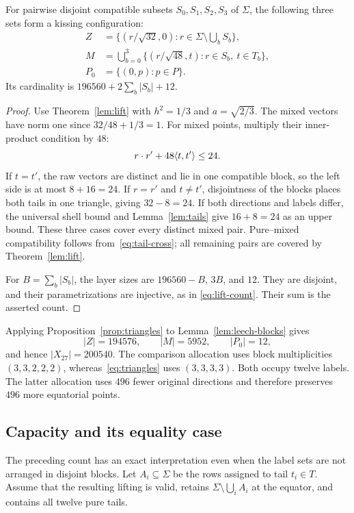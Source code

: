 \begin{proposition}\label{prop:triangles}
For pairwise disjoint compatible subsets $S_0,S_1,S_2,S_3$ of $\Sigma$,
the following three sets form a kissing configuration:
\begin{align}
 Z&=\{(r/\sqrt{32},0):r\in\Sigma\setminus\textstyle\bigcup_bS_b\},
 \nonumber\\
 M&=\bigcup_{b=0}^{3}\{(r/\sqrt{48},t):r\in S_b,\ t\in T_b\},
 \label{eq:d27}\\
 P_0&=\{(0,p):p\in P\}.\nonumber
\end{align}
Its cardinality is $196560+2\sum_b|S_b|+12$.
\end{proposition}
\begin{proof}
Use Theorem~\ref{lem:lift} with $h^2=1/3$ and $a=\sqrt{2/3}$.
The mixed vectors have norm one since $32/48+1/3=1$.
For mixed points, multiply their inner-product condition by $48$:
\begin{equation}\label{eq:raw-mixed}
 r\cdot r'+48\langle t,t'\rangle\le24.
\end{equation}
If $t=t'$, the raw vectors are distinct and lie in one compatible
block, so the left side is at most $8+16=24$. If $r=r'$ and $t\ne t'$,
disjointness of the blocks places both tails in one triangle, giving
$32-8=24$. If both directions and labels differ, the universal shell
bound and Lemma~\ref{lem:tails} give $16+8=24$ as an upper bound.
These three cases cover every distinct mixed pair. Pure--mixed
compatibility follows from~\eqref{eq:tail-cross}; all remaining pairs
are covered by Theorem~\ref{lem:lift}.

For $B=\sum_b|S_b|$, the layer sizes are $196560-B$, $3B$, and $12$.
They are disjoint, and their parametrizations are injective, as in
\eqref{eq:lift-count}. Their sum is the asserted count.
\end{proof}

Applying Proposition~\ref{prop:triangles} to Lemma~\ref{lem:leech-blocks}
gives
\[
 |Z|=194576,\qquad |M|=5952,\qquad |P_0|=12,
\]
and hence $|X_{27}|=200540$. The comparison allocation uses block
multiplicities $(3,3,2,2,2)$, whereas~\eqref{eq:triangles} uses
$(3,3,3,3)$. Both occupy twelve labels. The latter allocation uses
$496$ fewer original directions and therefore preserves $496$ more
equatorial points.

\subsection{Capacity and its equality case}
The preceding count has an exact interpretation even when the label
sets are not arranged in disjoint blocks. Let $A_i\subseteq\Sigma$
be the rows assigned to tail $t_i\in T$. Assume that the resulting
lifting is valid, retains $\Sigma\setminus\bigcup_iA_i$ at the equator,
and contains all twelve pure tails.


